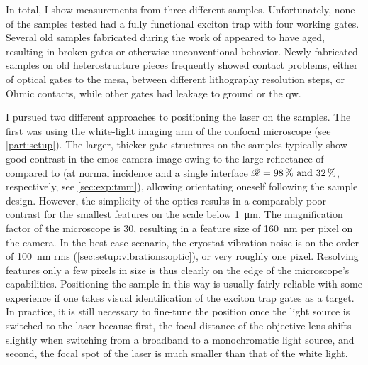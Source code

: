 In total, I show measurements from three different samples.
Unfortunately, none of the samples tested had a fully functional exciton trap with four working gates.
Several old samples fabricated during the work of \textcite{Descamps2021} appeared to have aged, resulting in broken gates or otherwise unconventional behavior.
Newly fabricated samples on old heterostructure pieces frequently showed contact problems, either of optical gates to the mesa, between different lithography resolution steps, or Ohmic contacts, while other gates had leakage to ground or the \gls{qw}.

I pursued two different approaches to positioning the laser on the samples.
The first was using the white-light imaging arm of the confocal microscope (see \cref{part:setup}).
The larger, thicker gate structures on the samples typically show good contrast in the \acrshort{cmos} camera image owing to the large reflectance of  compared to  (at normal incidence and a single interface $\reflectance = \qtylist{98;32}{\percent}$, respectively, see \cref{sec:exp:tmm}), allowing orientating oneself following the sample design.
However, the simplicity of the optics
results in a comparably poor contrast for the smallest features on the scale below \qty{1}{\micro\meter}.
The magnification factor of the microscope is \num{30}, resulting in a feature size of \qty{160}{\nano\meter} per pixel on the camera.
In the best-case scenario, the cryostat vibration noise is on the order of \qty{100}{\nano\meter} \gls{rms} (\cref{sec:setup:vibrations:optic}), or very roughly one pixel.
Resolving features only a few pixels in size is thus clearly on the edge of the microscope's capabilities.
Positioning the sample in this way is usually fairly reliable with some experience if one takes visual identification of the exciton trap gates as a target.
In practice, it is still necessary to fine-tune the position once the light source is switched to the laser because first, the focal distance of the objective lens shifts slightly when switching from a broadband to a monochromatic light source, and second, the focal spot of the laser is much smaller than that of the white light.

